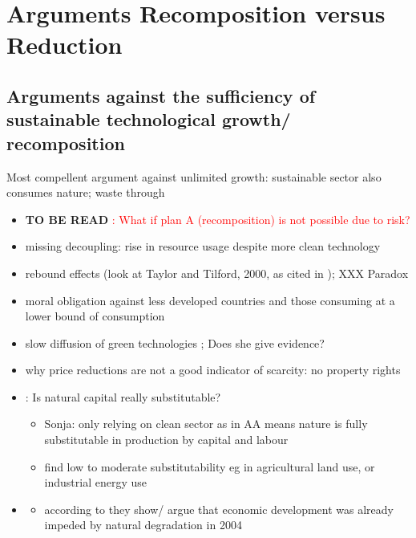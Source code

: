 \documentclass[12pt]{article}
\newcommand{\tr}[1]{\textcolor{red}{#1}}
\begin{document}
\section{Arguments Recomposition versus Reduction}
\subsection{Arguments against the sufficiency of sustainable technological growth/ recomposition}
Most compellent argument against unlimited growth: sustainable sector also consumes nature; waste through 
\begin{itemize}
	\item \textbf{TO BE READ} \tr{\cite{FuglesangClimateHowitt}:  What if plan A (recomposition) is not possible due to risk?}
\item missing decoupling: rise in  resource usage despite more clean technology \citep{Alexander2012TheContext}
\item rebound effects (look at Taylor and Tilford, 2000, as cited in \cite{Schor2005SustainableReduction}); XXX Paradox \citep{Alexander2012TheContext}
\item moral obligation against less developed countries and those consuming at a lower bound of consumption \citep{Alexander2012TheContext}
\item slow diffusion of green technologies \citep{Schor2005SustainableReduction}; Does she give evidence?
\item why price reductions are not a good indicator of scarcity: no property rights \citep{Schor2005SustainableReduction}
\item \cite{Cohen2019AnnualSubstitutable}: Is natural capital really substitutable?
\begin{itemize}
\item Sonja: only relying on clean sector as in AA means nature is fully substitutable in production by capital and labour
\item find low to moderate substitutability eg in agricultural land use, or industrial energy use
\end{itemize}
\item \cite{Arrow2004AreMuch}
\begin{itemize}
\item according to \cite{Cohen2019AnnualSubstitutable} they show/ argue that economic development was already impeded by natural degradation in 2004
\end{itemize}
\end{itemize}
\end{document}
